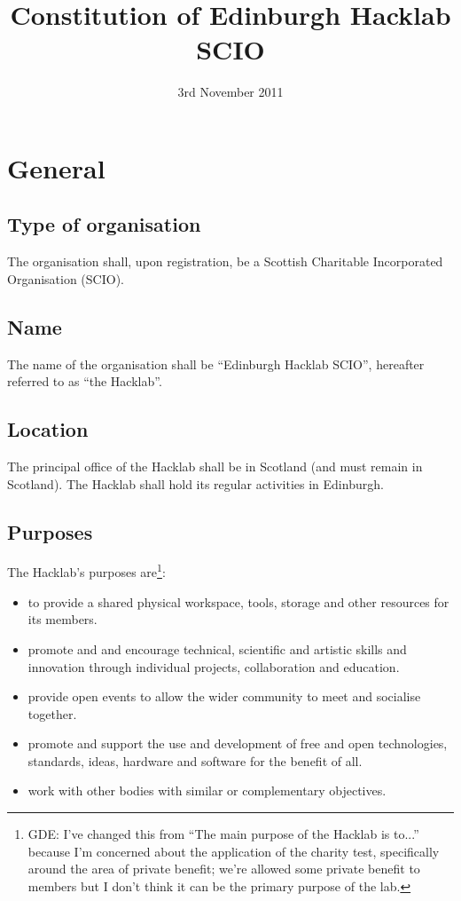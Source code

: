 \documentclass{article}
\title{Constitution of Edinburgh Hacklab SCIO}
\date{3rd November 2011}
\begin{document}
\maketitle
\cbstart
\section{General}
\subsection{Type of organisation}
\clause The organisation shall, upon registration, be a Scottish
Charitable Incorporated Organisation (SCIO).
\subsection{Name}
\clause The name of the organisation shall be ``Edinburgh Hacklab
SCIO'', hereafter referred to as ``the Hacklab''.
\subsection{Location}
\clause The principal office of the Hacklab shall be in Scotland (and
must remain in Scotland).
\cbend
\clause The Hacklab shall hold its regular activities in Edinburgh.
\subsection{Purposes}
\cbstart \clause The Hacklab's purposes are\footnote{GDE: I've changed
  this from ``The main purpose of the Hacklab is to...'' because I'm
  concerned about the application of the charity test, specifically
  around the area of private benefit; we're allowed some private
  benefit to members but I don't think it can be the primary purpose
  of the lab.}:
\begin{itemize}
\item to provide a shared physical workspace, tools, storage and other
  resources for its members.
\cbend
\item promote and and encourage technical, scientific and artistic
  skills and innovation through individual projects, collaboration and
  education.
\item provide open events to allow the wider community to meet and
  socialise together.
\item promote and support the use and development of free and open
  technologies, standards, ideas, hardware and software for the
  benefit of all.
\item work with other bodies with similar or complementary objectives.
\end{itemize}
\cbstart
\end{document}
